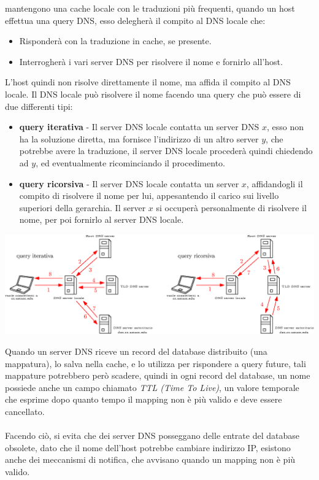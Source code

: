 \documentclass[12pt, letterpaper]{article}
\newcommand{\acc}{\\\hphantom{}\\}
\begin{document}
mantengono una cache locale con le traduzioni più frequenti, quando un host effettua una query DNS, esso 
delegherà il compito al DNS locale che:\begin{itemize}
    \item Risponderà con la traduzione in cache, se presente.
    \item Interrogherà i vari server DNS per risolvere il nome e fornirlo all'host.
\end{itemize} 
L'host quindi non risolve direttamente il nome, ma affida il compito al DNS locale. Il DNS locale può 
risolvere il nome facendo una query che può essere di due differenti tipi:\begin{itemize}
    \item \textbf{query iterativa} - Il server DNS locale contatta un server DNS $x$, esso non ha 
    la soluzione diretta, ma fornisce l'indirizzo di un altro server $y$, che potrebbe avere la 
    traduzione, il server DNS locale procederà quindi chiedendo ad $y$, ed eventualmente ricominciando il 
    procedimento. 
    \item \textbf{query ricorsiva} - Il server DNS locale contatta un server $x$, affidandogli il 
    compito di risolvere il nome per lui, appesantendo il carico sui livello superiori della gerarchia. Il 
    server $x$ si occuperà personalmente di risolvere il nome, per poi fornirlo al server DNS locale.
\end{itemize}\begin{center}
    \includegraphics[width=1\textwidth ]{images/risoluzioneDNS.eps}
\end{center}
Quando un server DNS riceve un record del database distribuito (una mappatura), lo salva nella cache, 
e lo utilizza per rispondere a query future, tali mappature potrebbero però scadere, quindi in ogni record del 
database, un nome possiede anche un campo chiamato \textit{TTL (Time To Live)}, un valore temporale che 
esprime dopo quanto tempo il mapping non è più valido e deve essere cancellato.\acc Facendo ciò, si evita che 
dei server DNS posseggano delle entrate del database obsolete, dato che il nome dell'host potrebbe 
cambiare indirizzo IP, esistono anche dei meccanismi di notifica, che avvisano quando un mapping non è 
più valido.
\end{document}
